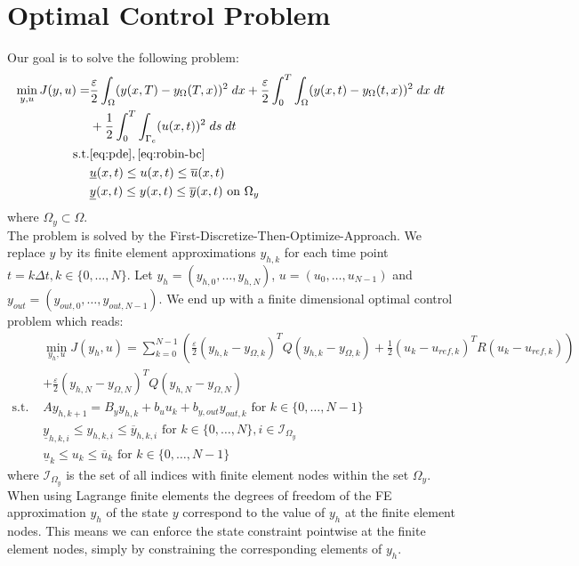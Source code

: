 \documentclass[
12pt, %
a4paper, %
onecolumn, %
portrait %
]{article}
\begin{document}
\section{Optimal Control Problem}
Our goal is to solve the following problem:
\begin{align*}
\min_{y,u} J(y, u) = & \frac{\varepsilon}{2}\int_{\Omega} (y(x, T) - y_{\Omega}(T,x))^2 \; dx + \frac{\varepsilon}{2} \int_{0}^{T} \int_{\Omega} (y(x,t) - y_{\Omega}(t,x))^2 \; dx \; dt \\
& + \frac{1}{2} \int_{0}^{T} \int_{\Gamma_c} (u(x,t))^2 \; ds \; dt \\
\text{s.t.} & \eqref{eq:pde}, \eqref{eq:robin-bc} \\
& \underline{u}(x,t) \leq u(x,t) \leq \overline{u}(x,t) \\
& \underline{y}(x,t) \leq y(x,t) \leq \overline{y}(x,t) \text{ on } \Omega_y
\end{align*}
where $\Omega_y \subset \Omega$.
\\
The problem is solved by the First-Discretize-Then-Optimize-Approach.
We replace $y$ by its finite element approximations $y_{h,k}$ for each time point $t = k \Delta t, k \in \{0, \hdots, N\}$. Let $y_h = (y_{h,0}, \hdots, y_{h,N})$, $u = (u_0, \hdots, u_{N-1})$ and $y_{out} = (y_{out,0}, \hdots, y_{out,N-1})$.
We end up with a finite dimensional optimal control problem which reads:
\begin{align*}
& \min_{y_h,u} J(y_h, u) = \sum_{k=0}^{N-1} \left( \frac{\varepsilon}{2} (y_{h,k} - y_{\Omega,k})^T Q (y_{h,k} - y_{\Omega,k}) + \frac{1}{2} (u_k - u_{ref,k})^T R (u_k - u_{ref,k}) \right) \\ 
& + \frac{\varepsilon}{2} (y_{h,N} - y_{\Omega,N})^T Q (y_{h,N} - y_{\Omega,N}) \\
\text{s.t. }  & A y_{h,k+1} = B_y y_{h,k} + b_u u_k + b_{y,out} y_{out,k} \text{ for } k \in \{0, \hdots, N-1\} \\
&\underline{y}_{h,k,i} \leq y_{h,k,i} \leq \overline{y}_{h,k,i} \text{ for } k \in \{0, \hdots, N\}, i \in \mathcal{I}_{\Omega_y} \\
&\underline{u}_{k} \leq u_{k} \leq \overline{u}_{k} \text{ for } k \in \{0, \hdots, N-1\}
\end{align*}
where $\mathcal{I}_{\Omega_y}$ is the set of all indices with finite element nodes within the set $\Omega_y$. When using Lagrange finite elements the degrees of freedom of the FE approximation $y_h$ of the state $y$ correspond to the value of $y_h$ at the finite element nodes. This means we can enforce the state constraint pointwise at the finite element nodes, simply by constraining the corresponding elements of $y_h$. \\
\end{document}

